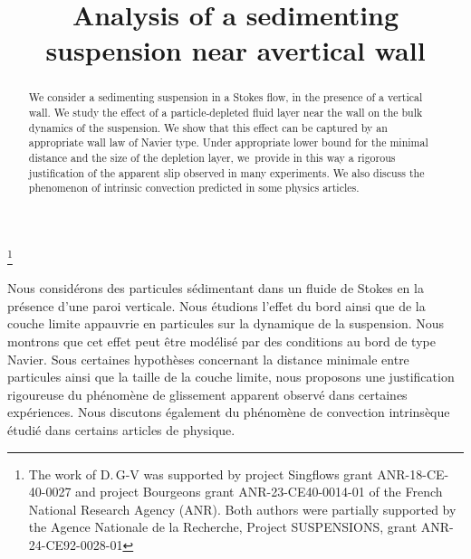 \documentclass[JEP,XML,SOM,Unicode,NoEqCountersInSection,published]{cedram}
\theoremstyle{plain}
\theoremstyle{definition}
\begin{document}
\frontmatter
\title{Analysis of a sedimenting suspension near a\nobreakspace vertical wall}

\author[\initial{D.} \lastname{Gérard-Varet}]{ }
\address{Université Paris Cité and Sorbonne Université, CNRS, IMJ-PRG,\\ F-75013 Paris, France}

\author[\initial{A.} \lastname{Mecherbet}]{ }
\address{Université Paris Cité and Sorbonne Université, CNRS, IMJ-PRG,\\ F-75013 Paris, France}

\thanks{The work of D.\,G-V was supported by project Singflows grant ANR-18-CE-40-0027 and project Bourgeons grant ANR-23-CE40-0014-01 of the French National Research Agency (ANR). Both authors were partially supported by the Agence Nationale de la Recherche, Project SUSPENSIONS, grant ANR-24-CE92-0028-01}

\begin{abstract}
We consider a sedimenting suspension in a Stokes flow, in the presence of a vertical wall. We study the effect of a particle-depleted fluid layer near the wall on the bulk dynamics of the suspension. We show that this effect can be captured by an appropriate wall law of Navier type. Under appropriate lower bound for the minimal distance and the size of the depletion layer, we~provide in this way a rigorous justification of the apparent slip observed in many experiments. We also discuss the phenomenon of intrinsic convection predicted in some physics articles.
\end{abstract}





\begin{altabstract}
Nous considérons des particules sédimentant dans un fluide de Stokes en la présence d'une paroi verticale. Nous étudions l'effet du bord ainsi que de la couche limite appauvrie en particules sur la dynamique de la suspension. Nous montrons que cet effet peut être modélisé par des conditions au bord de type Navier. Sous certaines hypothèses concernant la distance minimale entre particules ainsi que la taille de la couche limite, nous proposons une justification rigoureuse du phénomène de glissement apparent observé dans certaines expériences. Nous discutons également du phénomène de convection intrinsèque étudié dans certains articles de physique.
\end{altabstract}
\end{document}
